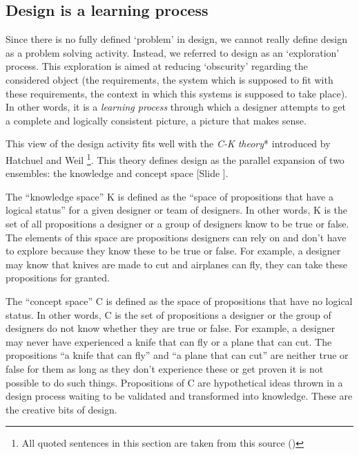 \documentclass{article}
\newcounter{slide}
\begin{document}
\subsection{Design is a learning process}
\label{sec:learning}
Since there is no fully defined `problem' in design, we cannot really define design as a problem solving activity. Instead, we referred to design as an `exploration' process. This exploration is aimed at reducing `obscurity' regarding the considered object (the requirements, the system which is supposed to fit with these requirements, the context in which this systems is supposed to take place). In other words, it is a \emph{learning process} through which a designer attempts to get a complete and logically consistent picture, a picture that makes sense. 


This view of the design activity fits well with the \emph{C-K theory}* introduced by Hatchuel and Weil \cite{hatchuel2003new}\footnote{All quoted sentences in this section are taken from this source (\cite{hatchuel2003new})}. This theory defines design as the parallel expansion of two ensembles: the knowledge and concept space {\color{blue}[Slide ]}. 

The ``knowledge space'' K is defined as the ``space of propositions that have a logical status'' for a given designer or team of designers. In other words, K is the set of all propositions a designer or a group of designers know to be true or false. The elements of this space are propositions designers can rely on and don't have to explore because they know these to be true or false. For example, a designer may know that knives are made to cut and airplanes can fly, they can take these propositions for granted. 

The ``concept space'' C is defined as the space of propositions that have no logical status. In other words, C is the set of propositions a designer or the group of designers do not know whether they are true or false. For example, a designer may never have experienced a knife that can fly or a plane that can cut. The propositions ``a knife that can fly'' and ``a plane that can cut'' are neither true or false for them as long as they don't experience these or get proven it is not possible to do such things. Propositions of C are hypothetical ideas thrown in a design process waiting to be validated and transformed into knowledge. These are the creative bits of design. 
\end{document}
